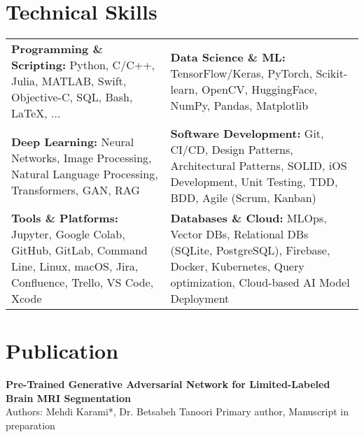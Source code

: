 \documentclass[letter,10pt]{article}
\newcommand{\customsquare}{\raisebox{0.25ex}{\scalebox{0.45}{$\blacksquare$}}}
\begin{document}
\section*{Technical Skills}
\begin{tabularx}{\textwidth}{@{}X@{\hspace{5mm}}X@{}}
\customsquare\hspace{2mm}\textbf{Programming \& Scripting:} Python, C/C++, Julia, MATLAB, Swift, Objective-C, SQL, Bash, LaTeX, ... & 
\customsquare\hspace{2mm}\textbf{Data Science \& ML:} TensorFlow/Keras, PyTorch, Scikit-learn, OpenCV, HuggingFace, NumPy, Pandas, Matplotlib \\
\vspace{-1mm}
\customsquare\hspace{2mm}\textbf{Deep Learning:} Neural Networks, Image Processing, Natural Language Processing, Transformers, GAN, RAG &
\vspace{-1mm}
\customsquare\hspace{2mm}\textbf{Software Development:} Git, CI/CD, Design Patterns, Architectural Patterns, SOLID, iOS Development, Unit Testing, TDD, BDD, Agile (Scrum, Kanban) \\
\vspace{-1mm}
\customsquare\hspace{2mm}\textbf{Tools \& Platforms:} Jupyter, Google Colab, GitHub, GitLab, Command Line, Linux, macOS, Jira, Confluence, Trello, VS Code, Xcode &
\vspace{-1mm}
\customsquare\hspace{2mm}\textbf{Databases \& Cloud:} MLOps, Vector DBs, Relational DBs (SQLite, PostgreSQL), Firebase, Docker, Kubernetes, Query optimization, Cloud-based AI Model Deployment
\end{tabularx}

\section*{Publication}
\textbf{Pre-Trained Generative Adversarial Network for Limited-Labeled Brain MRI Segmentation} \\ [5pt]
Authors: Mehdi Karami*, Dr. Betsabeh Tanoori \hfill *Primary author, Manuscript in preparation \\ [-12pt]

\end{document}
